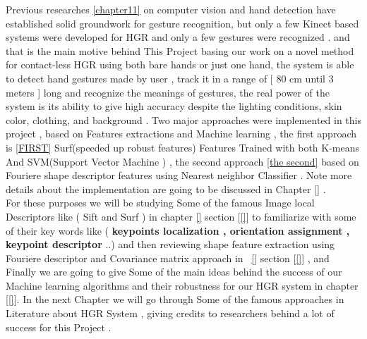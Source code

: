  Previous   researches  \ref{chapter11}  on  computer   vision  and  hand   detection    have established    solid  groundwork    for  gesture   recognition, but  only  a  few  Kinect based   systems   were  developed   for  HGR    and  only  a  few  gestures were  recognized . and that is  the main motive behind This Project  basing our work on a novel method for contact-less HGR using both bare hands or just  one hand, the system is able to detect hand  gestures  made by user  , track it  in a range of [ 80 cm until 3 meters ] long  and  recognize the meanings of gestures, the real power of the system is its ability to give high accuracy  despite the lighting  conditions,   skin color, clothing,  and background  .
 \newpage
Two major approaches were implemented in this project ,  based on Features extractions and Machine learning , the first approach  is \ref{FIRST} Surf(speeded up robust features) Features Trained with both K-means And SVM(Support Vector Machine ) , the second approach \ref{the second} based on Fouriere  shape descriptor  features using Nearest neighbor Classifier . Note more details about the implementation are going to be discussed in Chapter \ref{} . \\
For these purposes we will be studying  Some of the famous Image local Descriptors like ( Sift and Surf )  in chapter  \ref{} section [\ref {}]  to familiarize with some of their key words like ( \textbf{keypoints localization , orientation assignment , keypoint descriptor} ..)  and  then  reviewing shape feature extraction using Fouriere descriptor and Covariance matrix approach in \ \ref{} section [\ref {}] , and Finally we are going to give Some of the main ideas behind the success of our Machine learning algorithms and their robustness for our HGR system  in chapter [\ref{}].
In the next Chapter we will go through Some of the famous approaches in  Literature about HGR  System , giving credits  to researchers behind a lot of success for this Project .




